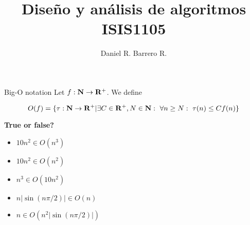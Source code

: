 \documentclass{beamer}
\title{Diseño y análisis de algoritmos \\ ISIS1105}
\author{Daniel R. Barrero R.}
\institute{Universidad de los Andes}
\begin{document}
\frame{\titlepage}

%

\begin{frame}{Big-O notation}
	Let $f : \mathbf{N} \to \mathbf{R}^+$. We define

	\begin{equation*}
		O(f) = \{\tau : \mathbf{N} \to \mathbf{R}^+ | \exists C \in \mathbf{R}^+, N \in \mathbf{N}:
		\ \forall n \geq N:\ \tau(n) \leq Cf(n)\}
	\end{equation*}

	\textbf{True or false?}
	\begin{itemize}
		\item $10n^2 \in O(n^3)$
		\item $10n^2 \in O(n^2)$
		\item $n^3 \in O(10n^2)$
		\item $n|\sin(n\pi/2)| \in O(n)$
		\item $n \in O(n^2|\sin(n\pi/2)|)$
	\end{itemize}
\end{frame}
\end{document}
